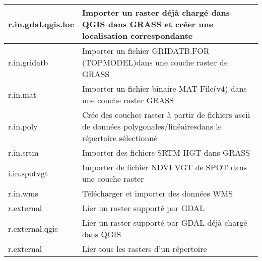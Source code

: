 \begin{center}
\begin{tabular}{|p{2.5cm}|p{11.5cm}|}
  \hline r.in.gdal.qgis.loc & Importer un raster déjà chargé dans QGIS dans GRASS et créer une localisation correspondante \\
  \hline r.in.gridatb & Importer un fichier GRIDATB.FOR (TOPMODEL)dans une couche raster de GRASS\\
  \hline r.in.mat  & Importer un fichier binaire MAT-File(v4) dans une couche raster GRASS \\
  \hline r.in.poly  & Crée des couches raster à partir de fichiers ascii de données polygonales/linéairesdans le répertoire sélectionné \\
  \hline r.in.srtm  & Importer des fichiers SRTM HGT dans GRASS \\
  \hline i.in.spotvgt & Importer de fichier NDVI VGT de SPOT dans une couche raster \\
  \hline r.in.wms & Télécharger et importer des données WMS \\  
  \hline r.external & Lier un raster supporté par GDAL\\  
  \hline r.external.qgis & Lier un raster supporté par GDAL déjà chargé dans QGIS \\  
  \hline r.external & Lier tous les rasters d'un répertoire \\  
  \hline
\end{tabular}
\end{center}

